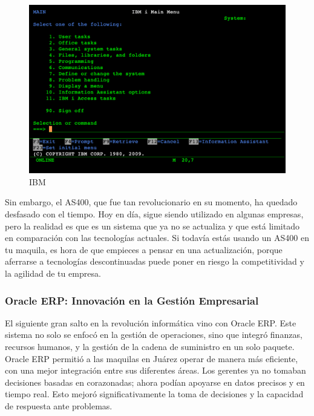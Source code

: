 \documentclass[
  letterpaper,
]{book}
\begin{document}
\begin{figure}[H]

{\centering \includegraphics{Img/ibm.png}

}

\caption{IBM}

\end{figure}%

Sin embargo, el AS400, que fue tan revolucionario en su momento, ha
quedado desfasado con el tiempo. Hoy en día, sigue siendo utilizado en
algunas empresas, pero la realidad es que es un sistema que ya no se
actualiza y que está limitado en comparación con las tecnologías
actuales. Si todavía estás usando un AS400 en tu maquila, es hora de que
empieces a pensar en una actualización, porque aferrarse a tecnologías
descontinuadas puede poner en riesgo la competitividad y la agilidad de
tu empresa.

\subsubsection{Oracle ERP: Innovación en la Gestión
Empresarial}\label{oracle-erp-innovaciuxf3n-en-la-gestiuxf3n-empresarial}

El siguiente gran salto en la revolución informática vino con Oracle
ERP. Este sistema no solo se enfocó en la gestión de operaciones, sino
que integró finanzas, recursos humanos, y la gestión de la cadena de
suministro en un solo paquete. Oracle ERP permitió a las maquilas en
Juárez operar de manera más eficiente, con una mejor integración entre
sus diferentes áreas. Los gerentes ya no tomaban decisiones basadas en
corazonadas; ahora podían apoyarse en datos precisos y en tiempo real.
Esto mejoró significativamente la toma de decisiones y la capacidad de
respuesta ante problemas.
\end{document}
